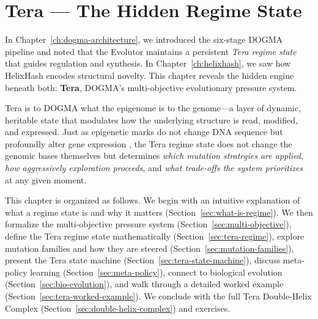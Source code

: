 
\chapter{Tera --- The Hidden Regime State}
\label{ch:tera}


\noindent
In Chapter~\ref{ch:dogma-architecture}, we introduced the six-stage DOGMA pipeline and noted that the Evolutor maintains a persistent \emph{Tera regime state} that guides regulation and synthesis. In Chapter~\ref{ch:helixhash}, we saw how HelixHash encodes structural novelty. This chapter reveals the hidden engine beneath both: \textbf{Tera}, DOGMA's multi-objective evolutionary pressure system.

Tera is to DOGMA what the epigenome is to the genome---a layer of dynamic, heritable state that modulates how the underlying structure is read, modified, and expressed. Just as epigenetic marks do not change DNA sequence but profoundly alter gene expression \citep{allis2016}, the Tera regime state does not change the genomic bases themselves but determines \emph{which mutation strategies are applied}, \emph{how aggressively exploration proceeds}, and \emph{what trade-offs the system prioritizes} at any given moment.

This chapter is organized as follows. We begin with an intuitive explanation of what a regime state is and why it matters (Section~\ref{sec:what-is-regime}). We then formalize the multi-objective pressure system (Section~\ref{sec:multi-objective}), define the Tera regime state mathematically (Section~\ref{sec:tera-regime}), explore mutation families and how they are steered (Section~\ref{sec:mutation-families}), present the Tera state machine (Section~\ref{sec:tera-state-machine}), discuss meta-policy learning (Section~\ref{sec:meta-policy}), connect to biological evolution (Section~\ref{sec:bio-evolution}), and walk through a detailed worked example (Section~\ref{sec:tera-worked-example}). We conclude with the full Tera Double-Helix Complex (Section~\ref{sec:double-helix-complex}) and exercises.

